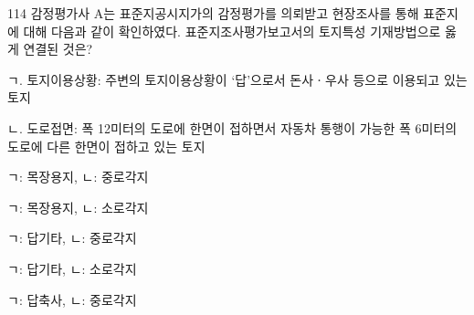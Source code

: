 \begin{question}{114}
감정평가사 A는 표준지공시지가의 감정평가를 의뢰받고 현장조사를 통해 표준지에 대해 다음과 같이 확인하였다. 표준지조사평가보고서의 토지특성 기재방법으로 옳게 연결된 것은?
\begin{framedtext}
ㄱ. 토지이용상황: 주변의 토지이용상황이 ‘답’으로서 돈사ㆍ우사 등으로 이용되고 있는 토지 \par
ㄴ. 도로접면: 폭 12미터의 도로에 한면이 접하면서 자동차 통행이 가능한 폭 6미터의 도로에 다른 한면이 접하고 있는 토지 \par
\end{framedtext}
\begin{choices}
  \item ㄱ: 목장용지, ㄴ: 중로각지
  \item ㄱ: 목장용지, ㄴ: 소로각지
  \item ㄱ: 답기타, ㄴ: 중로각지
  \item ㄱ: 답기타, ㄴ: 소로각지
  \item ㄱ: 답축사, ㄴ: 중로각지
\end{choices}
\end{question}
